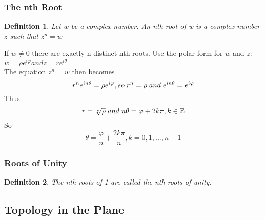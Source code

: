 \documentclass{article}
\newtheorem{definition}{Definition}[section]
\begin{document}
\subsubsection{The nth Root}
\begin{definition}
Let $w$ be a complex number. An nth root of w is a complex number $z$ such that $z^n = w$
\end{definition}
If $w \neq 0$ there are exactly n distinct nth roots. Use the polar form for $w$ and $z$: $w = \rho e^{i\varphi} and z = re^{i\theta}$ \\
The equation $z^n = w$ then becomes
\begin{equation*}
r^ne^{in\theta} = \rho e^{i\varphi}, so \hspace{0.1cm} r^n = \rho \hspace{0.1cm} and \hspace{0.1cm} e^{in\theta} = e^{i\varphi}
\end{equation*}
Thus 
\begin{equation*}
r = \sqrt[n]{\rho} \hspace{0.1cm} and \hspace{0.1cm} n\theta = \varphi + 2k\pi, k \in \mathbb{Z}
\end{equation*}
So 
\begin{equation*}
\theta = \frac{\varphi}{n} + \frac{2k\pi}{n}, k = 0, 1,..., n-1
\end{equation*}

\subsubsection{Roots of Unity}
\begin{definition}
The nth roots of 1 are called the nth roots of unity.
\end{definition}

\subsection{Topology in the Plane}
\end{document}

